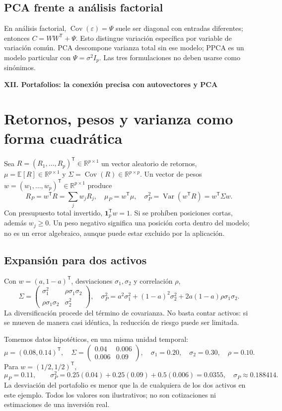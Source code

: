 \documentclass[11pt,a4paper]{article}
\newcommand{\R}{\mathbb R}
\newcommand{\E}{\mathbb E}
\newcommand{\T}{^{\mathsf T}}
\DeclareMathOperator{\Var}{Var}
\DeclareMathOperator{\Cov}{Cov}
\newcommand{\ones}{\mathbf 1}
\theoremstyle{definition}
\newcommand{\parte}[1]{\par\bigskip\Needspace{8\baselineskip}\begin{center}{\Large\bfseries\color{azul}#1}\end{center}}
\begin{document}
\subsection{PCA frente a análisis factorial}
En análisis factorial, $\Cov(\varepsilon)=\Psi$ suele ser diagonal con entradas diferentes; entonces $C=WW\T+\Psi$. Esto distingue variación específica por variable de variación común. PCA descompone varianza total sin ese modelo; PPCA es un modelo particular con $\Psi=\sigma^2I_p$. Las tres formulaciones no deben usarse como sinónimos.

\parte{XII. Portafolios: la conexión precisa con autovectores y PCA}
\section{Retornos, pesos y varianza como forma cuadrática}
Sea $R=(R_1,\ldots,R_p)\T\in\R^{p\times1}$ un vector aleatorio de retornos, $\mu=\E[R]\in\R^{p\times1}$ y $\Sigma=\Cov(R)\in\R^{p\times p}$. Un vector de pesos $w=(w_1,\ldots,w_p)\T\in\R^{p\times1}$ produce
\[
R_P=w\T R=\sum_jw_jR_j,\quad
\mu_P=w\T\mu,\quad
\sigma_P^2=\Var(w\T R)=w\T\Sigma w.
\]
Con presupuesto total invertido, $\ones_p\T w=1$. Si se prohíben posiciones cortas, además $w_j\ge0$. Un peso negativo significa una posición corta dentro del modelo; no es un error algebraico, aunque puede estar excluido por la aplicación.
\subsection{Expansión para dos activos}
Con $w=(a,1-a)\T$, desviaciones $\sigma_1,\sigma_2$ y correlación $\rho$,
\[
\Sigma=\begin{pmatrix}\sigma_1^2&\rho\sigma_1\sigma_2\\\rho\sigma_1\sigma_2&\sigma_2^2\end{pmatrix},\quad
\sigma_P^2=a^2\sigma_1^2+(1-a)^2\sigma_2^2+2a(1-a)\rho\sigma_1\sigma_2.
\]
La diversificación procede del término de covarianza. No basta contar activos: si se mueven de manera casi idéntica, la reducción de riesgo puede ser limitada.
\begin{ejemplo}
Tomemos datos hipotéticos, en una misma unidad temporal:
\[
\mu=(0.08,0.14)\T,\quad
\Sigma=\begin{pmatrix}0.04&0.006\\0.006&0.09\end{pmatrix},\quad
\sigma_1=0.20,\quad\sigma_2=0.30,\quad\rho=0.10.
\]
Para $w=(1/2,1/2)\T$,
\[
\mu_P=0.11,\qquad \sigma_P^2=0.25(0.04)+0.25(0.09)+0.5(0.006)=0.0355,
\quad\sigma_P\approx0.188414.
\]
La desviación del portafolio es menor que la de cualquiera de los dos activos en este ejemplo. Todos los valores son ilustrativos; no son cotizaciones ni estimaciones de una inversión real.
\end{ejemplo}
\end{document}
